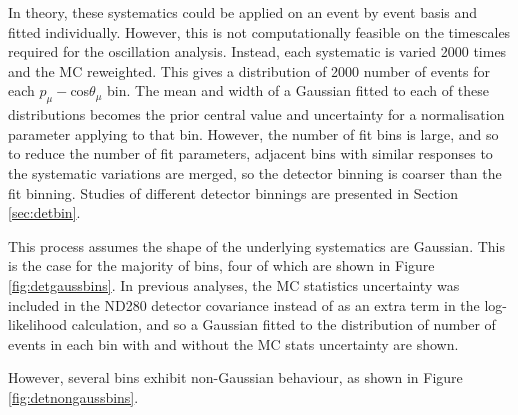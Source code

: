 In theory, these systematics could be applied on an event by event basis and fitted individually. However, this is not computationally feasible on the timescales required for the oscillation analysis. Instead, each systematic is varied 2000 times and the MC reweighted. This gives a distribution of 2000 number of events for each $p_{\mu}-$cos$\theta_{\mu}$ bin. The mean and width of a Gaussian fitted to each of these distributions becomes the prior central value and uncertainty for a normalisation parameter applying to that bin. However, the number of fit bins is large, and so to reduce the number of fit parameters, adjacent bins with similar responses to the systematic variations are merged, so the detector binning is coarser than the fit binning. Studies of different detector binnings are presented in Section \ref{sec:detbin}.

This process assumes the shape of the underlying systematics are Gaussian. This is the case for the majority of bins, four of which are shown in Figure \ref{fig:detgaussbins}. In previous analyses, the MC statistics uncertainty was included in the ND280 detector covariance instead of as an extra term in the log-likelihood calculation, and so a Gaussian fitted to the distribution of number of events in each bin with and without the MC stats uncertainty are shown.

However, several bins exhibit non-Gaussian behaviour, as shown in Figure \ref{fig:detnongaussbins}.

